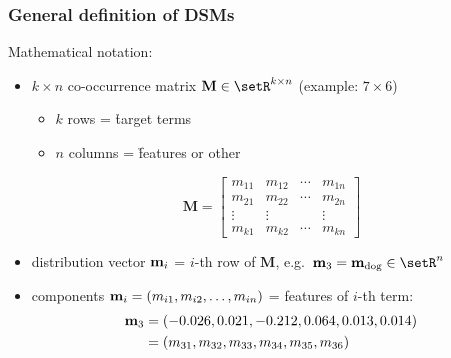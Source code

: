 \documentclass[t]{beamer} %
\begin{document}
\begin{frame}
  \frametitle{General definition of DSMs}

  Mathematical notation:
  \begin{itemize}
  \item $k \times n$ co-occurrence matrix $\mathbf{M}\in \setR^{k\times n}$ (example: $7\times 6$)
    \begin{itemize}
    \item $k$ rows = \h{target} terms 
    \item $n$ columns = \h{features} or other 
    \end{itemize}
    \begin{small}
      \gap[.5]
      \[
      \mathbf{M} =
      \begin{bmatrix}
        m_{11} & m_{12} & \cdots & m_{1n} \\
        m_{21} & m_{22} & \cdots & m_{2n} \\
        \vdots & \vdots & & \vdots \\
        m_{k1} & m_{k2} & \cdots & m_{kn}
      \end{bmatrix}
      \]
    \end{small}
  \item distribution vector $\Vector{m}_i$ = $i$-th row of $\mathbf{M}$, e.g.\ $\Vector{m}_3 = \Vector{m}_{\text{dog}} \in \setR^n$
  \item components $\Vector{m}_i = (m_{i1}, m_{i2}, \ldots, m_{in})$ = features of $i$-th term:
    \begin{align*}
      \Vector{m}_3 &= (-0.026, 0.021, -0.212, 0.064, 0.013, 0.014) \\
      &= (m_{31}, m_{32}, m_{33}, m_{34}, m_{35}, m_{36})
    \end{align*}
  \end{itemize}
\end{frame}
\end{document}
